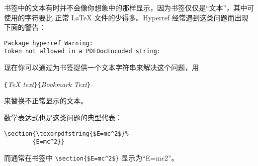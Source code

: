 
书签中的文本有时并不会像你想象中的那样显示，因为书签仅仅是“文本”，其中可使用的字符要比
正常 \LaTeX{} 文件的少得多。Hyperref 经常遇到这类问题而出现下面的警告：

\begin{code}
\begin{verbatim}
Package hyperref Warning:
Token not allowed in a PDFDocEncoded string:
\end{verbatim}
\end{code}


现在你可以通过为书签提供一个文本字符串来解决这个问题，用
\begin{lscommand}
\verb|{|\emph{\TeX{} text}\verb|}{|\emph{Bookmark Text}\verb|}|
\end{lscommand}
\noindent 来替换不正常显示的文本。


数学表达式也是这类问题的典型代表：
\begin{code}
\begin{verbatim}
\section{\texorpdfstring{$E=mc^2$}%
        {E=mc^2}}
\end{verbatim}
\end{code}
而通常在书签中 \verb+\section{$E=mc^2$}+ 显示为“E=mc2”。

